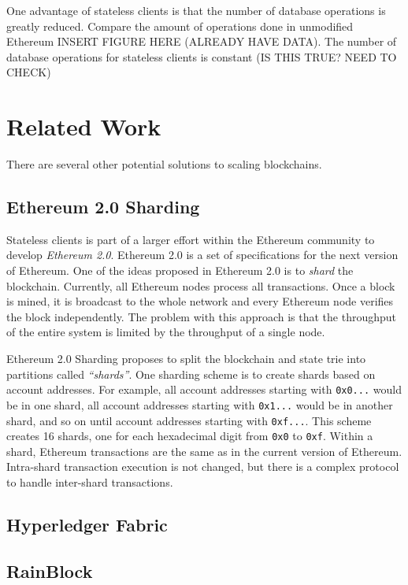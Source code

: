 \documentclass[12pt]{article}
\newcounter{protocol}
\begin{document}
One advantage of stateless clients is that the number of database operations is greatly reduced. Compare the amount of operations done in unmodified Ethereum INSERT FIGURE HERE (ALREADY HAVE DATA). The number of database operations for stateless clients is constant (IS THIS TRUE? NEED TO CHECK)

\section{Related Work}

There are several other potential solutions to scaling blockchains.

\subsection{Ethereum 2.0 Sharding}

Stateless clients is part of a larger effort within the Ethereum community to develop \emph{Ethereum 2.0}. Ethereum 2.0 is a set of specifications for the next version of Ethereum. One of the ideas proposed in Ethereum 2.0 is to \emph{shard} the blockchain. Currently, all Ethereum nodes process all transactions. Once a block is mined, it is broadcast to the whole network and every Ethereum node verifies the block independently. The problem with this approach is that the throughput of the entire system is limited by the throughput of a single node.

Ethereum 2.0 Sharding proposes to split the blockchain and state trie into partitions called \emph{``shards''}. One sharding scheme is to create shards based on account addresses. For example, all account addresses starting with \texttt{0x0...} would be in one shard, all account addresses starting with \texttt{0x1...} would be in another shard, and so on until account addresses starting with \texttt{0xf...}. This scheme creates 16 shards, one for each hexadecimal digit from \texttt{0x0} to \texttt{0xf}. Within a shard, Ethereum transactions are the same as in the current version of Ethereum. Intra-shard transaction execution is not changed, but there is a complex protocol to handle inter-shard transactions. %

\subsection{Hyperledger Fabric}



\subsection{RainBlock} \label{subsection:rainblock}
\end{document}
